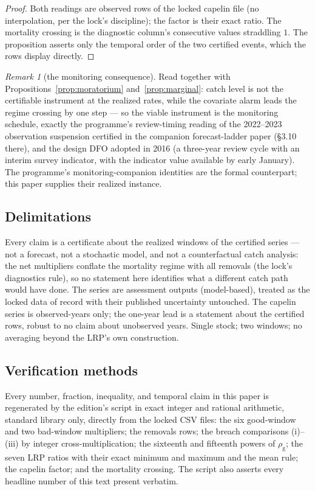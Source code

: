 \documentclass[10pt,twocolumn]{article}
\theoremstyle{plain}
\theoremstyle{remark}
\newtheorem{remark}[theorem]{Remark}
\begin{document}
\begin{proof}
Both readings are observed rows of the locked capelin file (no
interpolation, per the lock's discipline); the factor is their exact
ratio. The mortality crossing is the diagnostic column's consecutive
values straddling \(1\). The proposition asserts only the temporal
order of the two certified events, which the rows display directly.
\end{proof}

\begin{remark}[the monitoring consequence]\label{rem:monitoring}
Read together with Propositions~\ref{prop:moratorium}
and~\ref{prop:marginal}: catch level is not the certifiable instrument
at the realized rates, while the covariate alarm leads the regime
crossing by one step --- so the viable instrument is the monitoring
schedule, exactly the programme's review-timing reading of the
2022--2023 observation suspension certified in the companion
forecast-ladder paper (\S3.10 there), and the design DFO adopted in
2016 (a three-year review cycle with an interim survey indicator, with
the indicator value available by early January). The programme's
monitoring-companion identities are the formal counterpart; this paper
supplies their realized instance.
\end{remark}

\subsection{Delimitations}\label{scope}

Every claim is a certificate about the realized windows of the certified
series --- not a forecast, not a stochastic model, and not a
counterfactual catch analysis: the net multipliers conflate the
mortality regime with all removals (the lock's diagnostics rule), so no
statement here identifies what a different catch path would have done.
The series are assessment outputs (model-based), treated as the locked
data of record with their published uncertainty untouched. The capelin
series is observed-years only; the one-year lead is a statement about
the certified rows, robust to no claim about unobserved years. Single
stock; two windows; no averaging beyond the LRP's own construction.

\subsection{Verification methods}\label{methods}

Every number, fraction, inequality, and temporal claim in this paper is
regenerated by the edition's script in exact integer and rational
arithmetic, standard library only, directly from the locked CSV files:
the six good-window and two bad-window multipliers; the removals rows;
the breach comparisons (i)--(iii) by integer cross-multiplication; the
sixteenth and fifteenth powers of \(\rho_{\mathrm{g}}\); the seven LRP
ratios with their exact minimum and maximum and the mean rule; the
capelin factor; and the mortality crossing. The script also asserts
every headline number of this text present verbatim.
\end{document}
